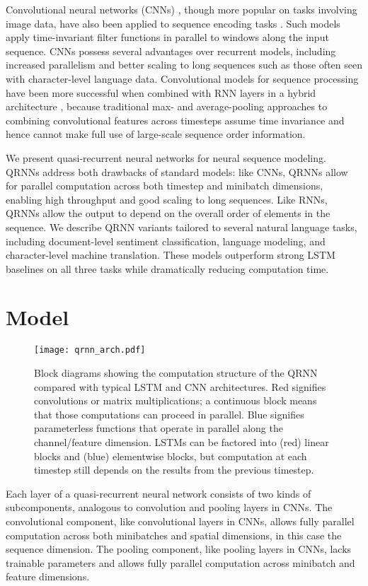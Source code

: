 \documentclass{article} \usepackage{iclr2017_conference,times}
\begin{document}
Convolutional neural networks (CNNs) \citep{Krizhevsky2012}, though more popular on tasks involving image data, have also been applied to sequence encoding tasks \citep{Zhang2015}. Such models apply time-invariant filter functions in parallel to windows along the input sequence.
CNNs possess several advantages over recurrent models, including increased parallelism and better scaling to long sequences such as those often seen with character-level language data.
Convolutional models for sequence processing have been more successful when combined with RNN layers in a hybrid architecture \citep{Lee2016}, because traditional max- and average-pooling approaches to combining convolutional features across timesteps assume time invariance and hence cannot make full use of large-scale sequence order information.

We present quasi-recurrent neural networks for neural sequence modeling. QRNNs address both  drawbacks of standard models: like CNNs, QRNNs allow for parallel computation across both timestep and minibatch dimensions, enabling high throughput and good scaling to long sequences. Like RNNs, QRNNs allow the output to depend on the overall order of elements in the sequence.
We describe QRNN variants tailored to several natural language tasks, including document-level sentiment classification, language modeling, and character-level machine translation. These models outperform strong LSTM baselines on all three tasks while dramatically reducing computation time.

\section{Model}
\begin{figure}[t!]
\centering
\texttt{[image: qrnn\_arch.pdf]}
\caption{
Block diagrams showing the computation structure of the QRNN compared with typical LSTM and CNN architectures. Red signifies convolutions or matrix multiplications; a continuous block means that those computations can proceed in parallel. Blue signifies parameterless functions that operate in parallel along the channel/feature dimension. LSTMs can be factored into (red) linear blocks and (blue) elementwise blocks, but computation at each timestep still depends on the results from the previous timestep.
}
\label{fig:QRNNmodel}
\end{figure}
Each layer of a quasi-recurrent neural network consists of two kinds of subcomponents, analogous to convolution and pooling layers in CNNs. The convolutional component, like convolutional layers in CNNs, allows fully parallel computation across both minibatches and spatial dimensions, in this case the sequence dimension.
The pooling component, like pooling layers in CNNs, lacks trainable parameters and allows fully parallel computation across minibatch and feature dimensions.
\end{document}
